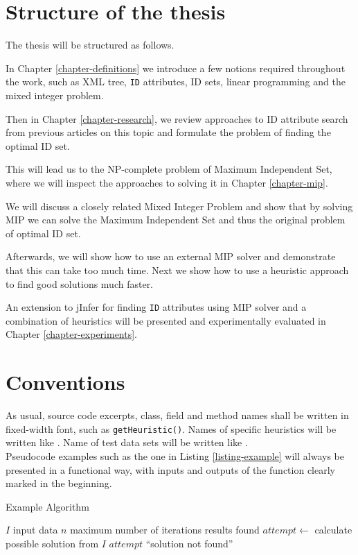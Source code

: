 \section*{Structure of the thesis}

The thesis will be structured as follows.

In Chapter \ref{chapter-definitions} we introduce a few notions required throughout the work, such as XML tree, \texttt{ID} attributes, ID sets, linear programming and the mixed integer problem.

Then in Chapter \ref{chapter-research}, we review approaches to ID attribute search from previous articles on this topic and formulate the problem of finding the optimal ID set.

This will lead us to the NP-complete problem of Maximum Independent Set, where we will inspect the approaches to solving it in Chapter \ref{chapter-mip}.

We will discuss a closely related Mixed Integer Problem and show that by solving MIP we can solve the Maximum Independent Set and thus the original problem of optimal ID set.

Afterwards, we will show how to use an external MIP solver and demonstrate that this can take too much time. Next we show how to use a heuristic approach to find good solutions much faster.

An extension to jInfer for finding \texttt{ID} attributes using MIP solver and a combination of heuristics will be presented and experimentally evaluated in Chapter \ref{chapter-experiments}.

\section*{Conventions}

As usual, source code excerpts, class, field and method names shall be written in fixed-width font, such as \texttt{get\-Heu\-ris\-tic()}. Names of specific heuristics will be written like . Name of test data sets will be written like .\\

Pseudocode examples such as the one in Listing \ref{listing-example} will always be presented in a functional way, with inputs and outputs of the function clearly marked in the beginning.

\begin{algorithm}
\caption{Example Algorithm}
\label{listing-example}
\begin{algorithmic}
\REQUIRE $I$ input data
\REQUIRE $n$ maximum number of iterations
\ENSURE results found
  \STATE {}
  \STATE $attempt \gets $ calculate possible solution from $I$
    \RETURN $attempt$
  \ENDIF
  \RETURN ``solution not found''
\ENDFOR
\end{algorithmic}
\end{algorithm}

